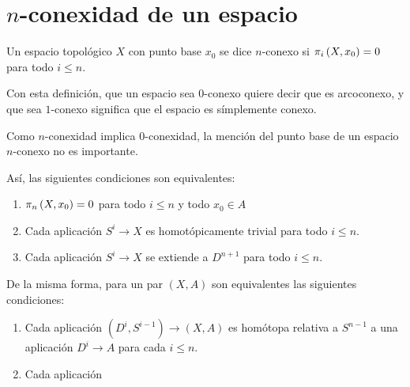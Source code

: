\section{$n$-conexidad de un espacio}
\begin{defin}
Un espacio topológico $X$ con punto base $x_0$ se dice $n$-conexo si $\pi_{i}\left(X, x_0\right) = 0$ para todo $i \leq n$.
\end{defin}
Con esta definición, que un espacio sea $0$-conexo quiere decir que es arcoconexo, y que sea $1$-conexo significa que el espacio es símplemente conexo. \par
Como $n$-conexidad implica $0$-conexidad, la mención del punto base de un espacio $n$-conexo no es importante. \par
Así, las siguientes condiciones son equivalentes:
\begin{enumerate}
\item $\pi_{n}\left(X, x_0\right) = 0$ para todo $i \leq n$ y todo $x_0 \in A$
\item Cada aplicación $S^i \longrightarrow X$ es homotópicamente trivial para todo $i \leq n$.
\item Cada aplicación $S^i \longrightarrow X$ se extiende a $D^{n+1}$ para todo $i \leq n$.
\end{enumerate}
De la misma forma, para un par $(X, A)$ son equivalentes las siguientes condiciones:
\begin{enumerate}
\item Cada aplicación $(D^i, S^{i-1}) \longrightarrow (X, A)$ es homótopa relativa a $S^{n-1}$ a una aplicación $D^i \longrightarrow A$ para cada $i \leq n$.
\item Cada aplicación
\end{enumerate}